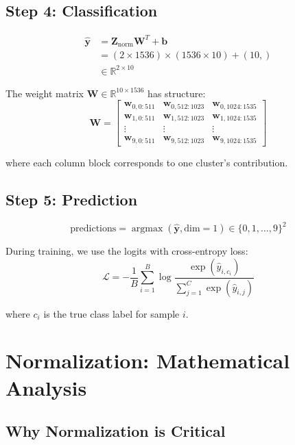 \documentclass[11pt,a4paper]{article}
\newcommand{\R}{\mathbb{R}}
\newcommand{\argmax}{\operatorname{argmax}}
\begin{document}
\subsection{Step 4: Classification}

\begin{align}
\hat{\mathbf{y}} &= \mathbf{Z}_{\text{norm}} \mathbf{W}^T + \mathbf{b} \\
&= (2 \times 1536) \times (1536 \times 10) + (10,) \\
&\in \R^{2 \times 10}
\end{align}

The weight matrix $\mathbf{W} \in \R^{10 \times 1536}$ has structure:
\begin{equation}
\mathbf{W} = \begin{bmatrix}
\mathbf{w}_{0,0:511} & \mathbf{w}_{0,512:1023} & \mathbf{w}_{0,1024:1535} \\
\mathbf{w}_{1,0:511} & \mathbf{w}_{1,512:1023} & \mathbf{w}_{1,1024:1535} \\
\vdots & \vdots & \vdots \\
\mathbf{w}_{9,0:511} & \mathbf{w}_{9,512:1023} & \mathbf{w}_{9,1024:1535}
\end{bmatrix}
\end{equation}

where each column block corresponds to one cluster's contribution.

\subsection{Step 5: Prediction}

\begin{equation}
\text{predictions} = \argmax(\hat{\mathbf{y}}, \text{dim}=1) \in \{0, 1, \ldots, 9\}^2
\end{equation}

During training, we use the logits with cross-entropy loss:
\begin{equation}
\mathcal{L} = -\frac{1}{B} \sum_{i=1}^{B} \log \frac{\exp(\hat{y}_{i,c_i})}{\sum_{j=1}^{C} \exp(\hat{y}_{i,j})}
\end{equation}

where $c_i$ is the true class label for sample $i$.

\section{Normalization: Mathematical Analysis}

\subsection{Why Normalization is Critical}
\end{document}

